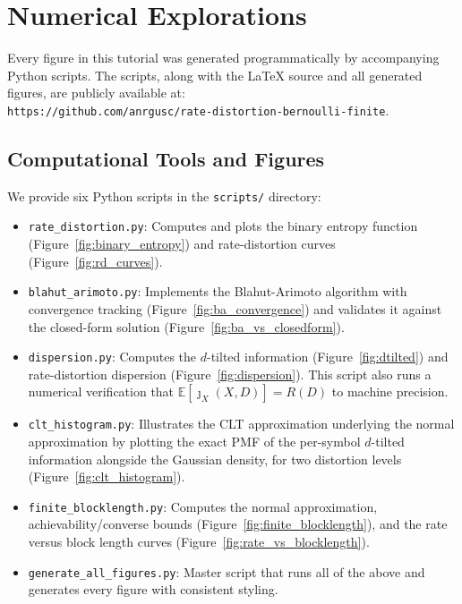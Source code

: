 \documentclass[11pt]{article}
\newcommand{\RD}{R(D)}
\newcommand{\E}{\mathbb{E}}
\begin{document}
\section{Numerical Explorations}
\label{sec:numerical}

Every figure in this tutorial was generated programmatically by accompanying
Python scripts.
The scripts, along with the \LaTeX{} source and all generated figures, are
publicly available at:\\
\texttt{https://github.com/anrgusc/rate-distortion-bernoulli-finite}.

\subsection{Computational Tools and Figures}

We provide six Python scripts in the \texttt{scripts/} directory:
\begin{itemize}
    \item \texttt{rate\_distortion.py}: Computes and plots the binary entropy
          function (Figure~\ref{fig:binary_entropy}) and rate-distortion curves
          (Figure~\ref{fig:rd_curves}).
    \item \texttt{blahut\_arimoto.py}: Implements the Blahut-Arimoto algorithm
          with convergence tracking (Figure~\ref{fig:ba_convergence}) and
          validates it against the closed-form solution
          (Figure~\ref{fig:ba_vs_closedform}).
    \item \texttt{dispersion.py}: Computes the $d$-tilted information
          (Figure~\ref{fig:dtilted}) and rate-distortion dispersion
          (Figure~\ref{fig:dispersion}).
          This script also runs a numerical verification that
          $\E[\jmath_X(X,D)] = \RD$ to machine precision.
    \item \texttt{clt\_histogram.py}: Illustrates the CLT approximation
          underlying the normal approximation by plotting the exact PMF
          of the per-symbol $d$-tilted information alongside the Gaussian
          density, for two distortion levels
          (Figure~\ref{fig:clt_histogram}).
    \item \texttt{finite\_blocklength.py}: Computes the normal approximation,
          achievability/converse bounds (Figure~\ref{fig:finite_blocklength}),
          and the rate versus block length curves
          (Figure~\ref{fig:rate_vs_blocklength}).
    \item \texttt{generate\_all\_figures.py}: Master script that runs all of the
          above and generates every figure with consistent styling.
\end{itemize}
\end{document}
